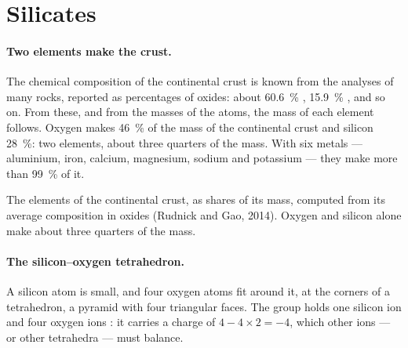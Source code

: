 \section{Silicates}

\paragraph{Two elements make the crust.} The chemical composition of the
continental crust is known from the analyses of many rocks, reported as
percentages of oxides: about \qty{60.6}{\percent} ,
\qty{15.9}{\percent} , and so on. From these, and from the masses of
the atoms, the mass of each element follows. Oxygen makes \qty{46}{\percent}
of the mass of the continental crust and silicon \qty{28}{\percent}: two
elements, about three quarters of the mass. With six metals --- aluminium,
iron, calcium, magnesium, sodium and potassium --- they make more than
\qty{99}{\percent} of it.

\begin{omfigure}

{\small The elements of the continental crust, as shares of its mass,
computed from its average composition in oxides (Rudnick and Gao, 2014).
Oxygen and silicon alone make about three quarters of the mass.}
\end{omfigure}

\paragraph{The silicon--oxygen tetrahedron.} A silicon atom is small, and
four oxygen atoms fit around it, at the corners of a tetrahedron, a pyramid
with four triangular faces. The group holds one silicon ion  and
four oxygen ions : it carries a charge of $4 - 4 \times 2 = -4$,
which other ions --- or other tetrahedra --- must balance.

